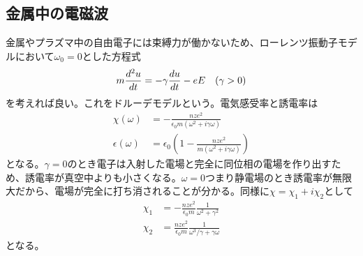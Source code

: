\subsection{金属中の電磁波}
    金属やプラズマ中の自由電子には束縛力が働かないため、ローレンツ振動子モデルにおいて$\omega_0 = 0$とした方程式
        \[m\de[^2u]{t} =  - \gamma \de[u]{t} - eE \quad (\gamma > 0)\]
    を考えれば良い。これをドルーデモデルという。電気感受率と誘電率は
    \begin{align*}
        \chi(\omega) &= -\frac{nze^2}{\epsilon_0m(\omega^2 + i\gamma\omega)}\\
        \epsilon(\omega) &= \epsilon_0\left(1 - \frac{nze^2}{m(\omega^2 + i\gamma\omega)}\right)
    \end{align*}
    となる。$\gamma = 0$のとき電子は入射した電場と完全に同位相の電場を作り出すため、誘電率が真空中よりも小さくなる。$\omega = 0$つまり静電場のとき誘電率が無限大だから、電場が完全に打ち消されることが分かる。同様に$\chi = \chi_1 + i\chi_2$として
    \begin{align*}
        \chi_1 &= -\frac{nze^2}{\epsilon_0m}\frac{1}{\omega^2 + \gamma^2}\\
        \chi_2 &= \frac{nze^2}{\epsilon_0m}\frac{1}{\omega^3 / \gamma + \gamma\omega}
    \end{align*}
    となる。

